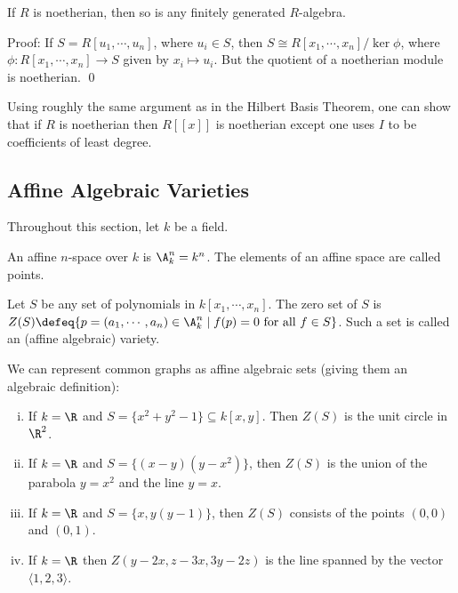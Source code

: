 \begin{cor}
If $R$ is noetherian, then so is any finitely generated $R$-algebra. 
\end{cor}

\noindent Proof: If $S=R[u_1,\cdots,u_n]$, where $u_i \in S$, then $S \cong R[x_1,\cdots,x_n]/\ker \phi$, where $\phi: R[x_1,\cdots,x_n] \to S$ given by $x_i \mapsto u_i$. But the quotient of a noetherian module is noetherian. \qed \\

\begin{rem}
Using roughly the same argument as in the Hilbert Basis Theorem, one can show that if $R$ is noetherian then $R[[x]]$ is noetherian except one uses $I$ to be coefficients of least degree. 
\end{rem}

\subsection{Affine Algebraic Varieties}

Throughout this section, let $k$ be a field.

\begin{dfn}
An affine $n$-space over $k$ is $\A_k^n=k^n$. The elements of an affine space are called points. 
\end{dfn}

\begin{dfn}
Let $S$ be any set of polynomials in $k[x_1,\cdots,x_n]$. The zero set of $S$ is $Z(S) \defeq \{ p=(a_1,\cdots,a_n) \in \A_k^n \;|\; f(p)=0 \text{ for all }f \in S\}$. Such a set is called an (affine algebraic) variety. 
\end{dfn}

\begin{ex} We can represent common graphs as affine algebraic sets (giving them an algebraic definition): 
\begin{enumerate}[(i)]
\item If $k=\R$ and $S=\{x^2+y^2-1\} \subseteq k[x,y]$. Then $Z(S)$ is the unit circle in $\R^2$. 

\item If $k=\R$ and $S=\{(x-y)(y-x^2)\}$, then $Z(S)$ is the union of the parabola $y=x^2$ and the line $y=x$. 

\item If $k=\R$ and $S=\{x,y(y-1)\}$, then $Z(S)$ consists of the points $(0,0)$ and $(0,1)$. 

\item If $k=\R$ then $Z(y-2x,z-3x,3y-2z)$ is the line spanned by the vector $\langle 1,2,3 \rangle$. 

\end{enumerate}
\end{ex}

